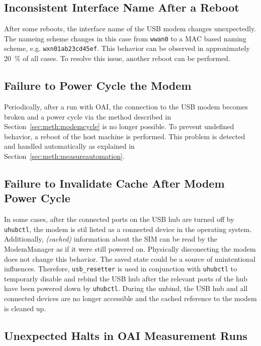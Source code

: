 \subsection{Inconsistent Interface Name After a Reboot}\label{sec:meth:issueinterfacename}

After some reboots, the interface name of the USB modem changes unexpectedly.
The nameing scheme changes in this case from \texttt{wwan0} to a MAC based naming scheme, e.g. \texttt{wxn01ab23cd45ef}.
This behavior can be observed in approximately \SI{20}{\percent} of all cases.
To resolve this issue, another reboot can be performed.

\subsection{Failure to Power Cycle the Modem}\label{sec:meth:probmodemcycle}

Periodically, after a run with OAI, the connection to the USB modem becomes broken and a power cycle
via the method described in Section~\ref{sec:meth:modemcycle} is no longer possible.
To prevent undefined behavior, a reboot of the host machine is performed.
This problem is detected and handled automatically as explained in Section~\ref{sec:meth:measureautomation}.

\subsection{Failure to Invalidate Cache After Modem Power Cycle}\label{sec:meth:probmodemcyclecache}

In some cases, after the connected ports on the USB hub are turned off by \texttt{uhubctl}, the modem is stil
listed as a connected device in the operating system.
Additionally, \emph{(cached)} information about the SIM can be read by the ModemManager as if it were still powered on.
Physically disconecting the modem does not change this behavior.
The saved state could be a source of unintentional influences.
Therefore, \texttt{usb\_resetter} is used in conjunction with \texttt{uhubctl} to temporarly disable
and rebind the USB hub after the relevant ports of the hub have been powered down by \texttt{uhubctl}.
During the unbind, the USB hub and all connected devices are no longer accessible and the cached reference to
the modem is cleaned up.

\subsection{Unexpected Halts in OAI Measurement Runs}

